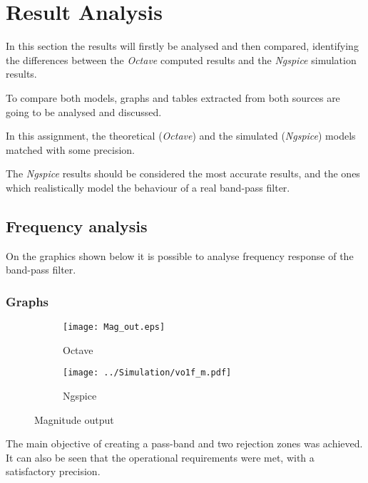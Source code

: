 \section{Result Analysis}
\label{sec:ResultAnalysis}


\indent

In this section the results will firstly be analysed and then compared, identifying the differences between the {\it Octave} computed results and the {\it Ngspice} simulation results. 

To compare both models, graphs and tables extracted from both sources are going to be analysed and discussed.

In this assignment, the theoretical ({\it Octave}) and the simulated ({\it Ngspice}) models matched with some precision. 

The {\it Ngspice} results should be considered the most accurate results, and the ones which realistically model the behaviour of a real band-pass filter. 

\subsection{Frequency analysis}

On the graphics shown below it is possible to analyse frequency response of the band-pass filter. 

\subsubsection*{Graphs}

\begin{figure}[H]
\centering
\begin{subfigure}{.49\textwidth}
  \centering
  \texttt{[image: Mag\_out.eps]}
  \caption{Octave}
  \label{fig:MagOC}
\end{subfigure}%
\begin{subfigure}{.49\textwidth}
  \centering
  \texttt{[image: ../Simulation/vo1f\_m.pdf]}
  \caption{Ngspice}
  \label{fig:MagNG}
\end{subfigure}
\caption{Magnitude output}
\label{fig:Mag}
\end{figure}

The main objective of creating a pass-band and two rejection zones was achieved. It can also be seen that the operational requirements were met, with a satisfactory precision.

\bigskip


